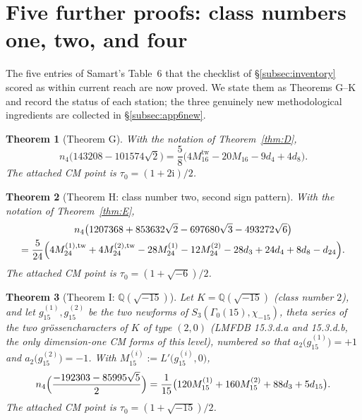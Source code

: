 \documentclass[11pt]{article}
\newcommand{\Qq}{\mathbb{Q}}
\newcommand{\ii}{\mathrm{i}}
\newtheorem{theorem}{Theorem}[section]
\theoremstyle{definition}
\theoremstyle{remark}
\begin{document}
\section{Five further proofs: class numbers one, two, and four}
\label{sec:app6}

The five entries of Samart's Table~6 that the checklist of
\S\ref{subsec:inventory} scored as within current reach are now
proved. We state them as Theorems G--K and record the status of
each station; the three genuinely new methodological ingredients
are collected in \S\ref{subsec:app6new}.

\begin{theorem}[Theorem G]\label{thm:G}
With the notation of Theorem~\ref{thm:D},
\[
  n_4\bigl(143208-101574\sqrt2\bigr)
  =\frac58\bigl(4M_{16}^{\mathrm{tw}}-20M_{16}-9d_4+4d_8\bigr).
\]
The attached CM point is $\tau_0=(1+2\ii)/2$.
\end{theorem}

\begin{theorem}[Theorem H: class number two, second sign pattern]
\label{thm:H}
With the notation of Theorem~\ref{thm:E},
\begin{multline*}
  n_4\bigl(1207368+853632\sqrt2-697680\sqrt3-493272\sqrt6\bigr)\\
  =\frac{5}{24}\Bigl(4M_{24}^{(1),\mathrm{tw}}+4M_{24}^{(2),\mathrm{tw}}
   -28M_{24}^{(1)}-12M_{24}^{(2)}
   -28d_3+24d_4+8d_8-d_{24}\Bigr).
\end{multline*}
The attached CM point is $\tau_0=(1+\sqrt{-6})/2$.
\end{theorem}

\begin{theorem}[Theorem I:
\texorpdfstring{$\Qq(\sqrt{-15})$}{Q(sqrt(-15))}]\label{thm:I}
Let $K=\Qq(\sqrt{-15})$ \textup{(}class number $2$\textup{)}, and let
$g_{15}^{(1)},g_{15}^{(2)}$ be the two newforms of
$S_3(\Gamma_0(15),\chi_{-15})$, theta series of the two
gr\"ossencharacters of $K$ of type $(2,0)$ \textup{(}LMFDB
\textup{\textsf{15.3.d.a}} and \textup{\textsf{15.3.d.b}}, the only
dimension-one CM forms of this level\textup{)}, numbered so that
$a_2\bigl(g_{15}^{(1)}\bigr)=+1$ and $a_2\bigl(g_{15}^{(2)}\bigr)=-1$.
With $M_{15}^{(i)}:=L'\bigl(g_{15}^{(i)},0\bigr)$,
\[
  n_4\Bigl(\frac{-192303-85995\sqrt5}{2}\Bigr)
  =\frac1{15}\bigl(120M_{15}^{(1)}+160M_{15}^{(2)}+88d_3+5d_{15}\bigr).
\]
The attached CM point is $\tau_0=(1+\sqrt{-15})/2$.
\end{theorem}
\end{document}
